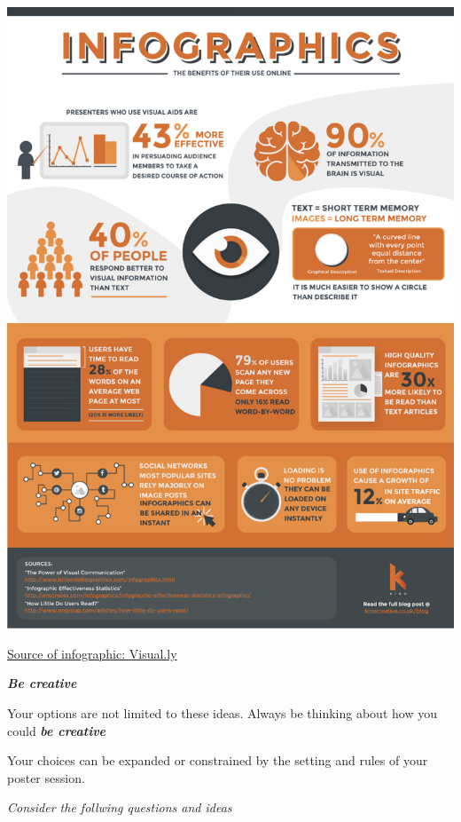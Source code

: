 \documentclass[
]{book}
\begin{document}
\begin{center}\includegraphics[width=20.83in]{img/infographic} \end{center}

\href{https://visual.ly/community/Infographics/technology/infographics-benefits-their-use-online?utm_source=visually_embed}{Source of infographic: Visual.ly}

\textbf{\emph{Be creative}}

Your options are not limited to these ideas. Always be thinking about how you could \textbf{\emph{be creative}}

Your choices can be expanded or constrained by the setting and rules of your poster session.

\emph{Consider the follwing questions and ideas}
\end{document}
